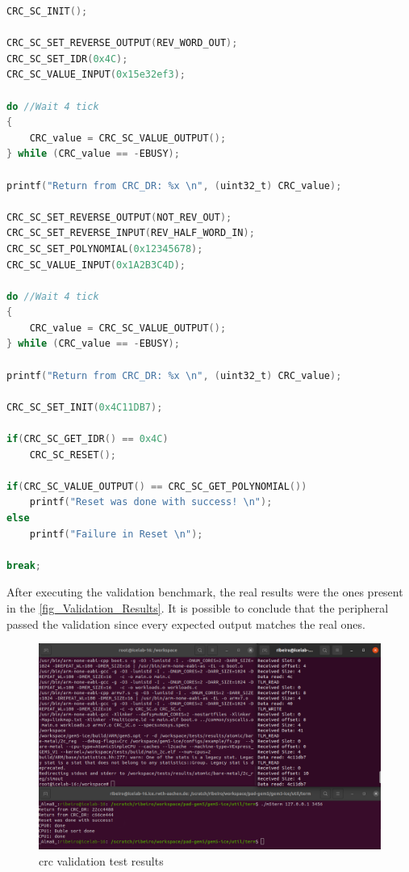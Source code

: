 \begin{lstlisting}[language=C, caption={CRC validation code}, label=validationCodeCRC]
CRC_SC_INIT();

CRC_SC_SET_REVERSE_OUTPUT(REV_WORD_OUT);
CRC_SC_SET_IDR(0x4C);
CRC_SC_VALUE_INPUT(0x15e32ef3);       

do //Wait 4 tick
{
	CRC_value = CRC_SC_VALUE_OUTPUT();
} while (CRC_value == -EBUSY);

printf("Return from CRC_DR: %x \n", (uint32_t) CRC_value);

CRC_SC_SET_REVERSE_OUTPUT(NOT_REV_OUT);
CRC_SC_SET_REVERSE_INPUT(REV_HALF_WORD_IN);
CRC_SC_SET_POLYNOMIAL(0x12345678);
CRC_SC_VALUE_INPUT(0x1A2B3C4D);

do //Wait 4 tick
{
	CRC_value = CRC_SC_VALUE_OUTPUT();
} while (CRC_value == -EBUSY);

printf("Return from CRC_DR: %x \n", (uint32_t) CRC_value); 

CRC_SC_SET_INIT(0x4C11DB7);

if(CRC_SC_GET_IDR() == 0x4C)
	CRC_SC_RESET();

if(CRC_SC_VALUE_OUTPUT() == CRC_SC_GET_POLYNOMIAL())
	printf("Reset was done with success! \n");
else
	printf("Failure in Reset \n");

break;
\end{lstlisting}

After executing the validation benchmark, the real results were the ones present in the \autoref{fig_Validation_Results}. It is possible to 
conclude that the peripheral passed the validation since every expected output matches the real ones. 

\begin{figure}[H]
	\centering
 	\includegraphics[width=0.8\linewidth]{Images/Validation_Results.png} 
 	\caption{\gls*{crc} validation test results}
	\label{fig_Validation_Results}
\end{figure}


